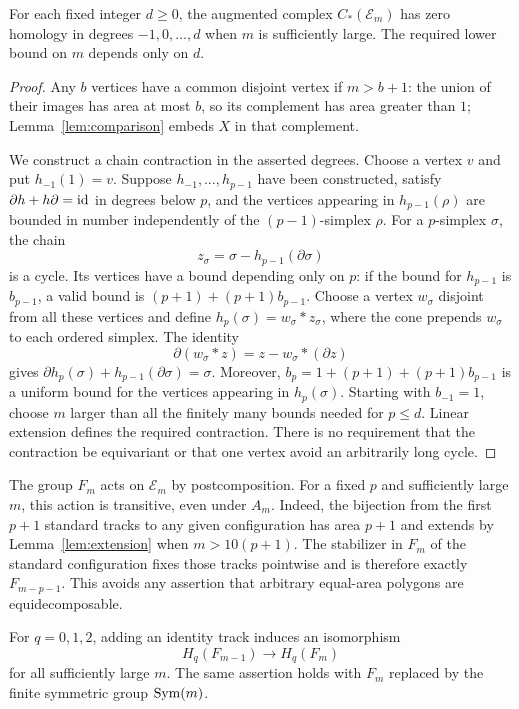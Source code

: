 \begin{lemma}\label{lem:hom-configuration-acyclic}
For each fixed integer $d\geq0$, the augmented complex
$C_*(\mathcal E_m)$ has zero homology in degrees $-1,0,\ldots,d$ when $m$ is
sufficiently large.  The required lower bound on $m$ depends only on $d$.
\end{lemma}

\begin{proof}
Any $b$ vertices have a common disjoint vertex if $m>b+1$: the union of their
images has area at most $b$, so its complement has area greater than $1$;
Lemma~\ref{lem:comparison} embeds $X$ in that complement.

We construct a chain contraction in the asserted degrees.  Choose a vertex
$v$ and put $h_{-1}(1)=v$.  Suppose $h_{-1},\ldots,h_{p-1}$ have been
constructed, satisfy $\partial h+h\partial=\operatorname{id}$ in degrees below $p$, and
the vertices appearing in $h_{p-1}(\rho)$ are bounded in number independently
of the $(p-1)$-simplex $\rho$.  For a $p$-simplex $\sigma$, the chain
\[
 z_\sigma=\sigma-h_{p-1}(\partial\sigma)
\]
is a cycle.  Its vertices have a bound depending only on $p$: if the bound
for $h_{p-1}$ is $b_{p-1}$, a valid bound is
$(p+1)+(p+1)b_{p-1}$.  Choose a vertex $w_\sigma$ disjoint from all these
vertices and define $h_p(\sigma)=w_\sigma*z_\sigma$, where the cone prepends
$w_\sigma$ to each ordered simplex.  The identity
\[
 \partial(w_\sigma*z)=z-w_\sigma*(\partial z)
\]
gives $\partial h_p(\sigma)+h_{p-1}(\partial\sigma)=\sigma$.
Moreover, $b_p=1+(p+1)+(p+1)b_{p-1}$ is a uniform bound for the vertices
appearing in $h_p(\sigma)$.  Starting with $b_{-1}=1$, choose $m$ larger
than all the finitely many bounds needed for $p\leq d$.  Linear extension
defines the required contraction.  There is no requirement that the
contraction be equivariant or that one vertex avoid an arbitrarily long
cycle.
\end{proof}

The group $F_m$ acts on $\mathcal E_m$ by postcomposition.  For a fixed $p$
and sufficiently large $m$, this action is transitive, even under $A_m$.
Indeed, the bijection from the first $p+1$ standard tracks to any given
configuration has area $p+1$ and extends by Lemma~\ref{lem:extension} when
$m>10(p+1)$.  The stabilizer in $F_m$ of the standard configuration fixes
those tracks pointwise and is therefore exactly $F_{m-p-1}$.  This avoids
any assertion that arbitrary equal-area polygons are equidecomposable.

\begin{lemma}\label{lem:hom-full-stability}
For $q=0,1,2$, adding an identity track induces an isomorphism
\[
 H_q(F_{m-1})\longrightarrow H_q(F_m)
\]
for all sufficiently large $m$.
The same assertion holds with $F_m$ replaced by the finite symmetric
group $\operatorname{Sym}(m)$.
\end{lemma}

